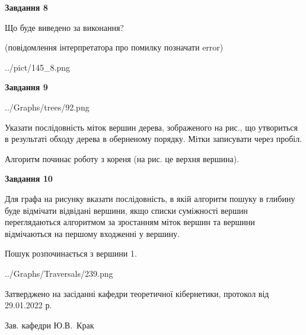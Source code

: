 \documentclass[12pt, ukrainian]{article}
\begin{document}
{\begin {large}
{\begin {center}\textbf{Завдання 8}\end {center}}\par
Що буде виведено за виконання?\par
 (повідомлення інтерпретатора про помилку позначати error)\par
\begin{center}
	{../pict/145_8.png}
\end{center}
\newpage

{\begin {center}\textbf{Завдання 9}\end {center}}\par

\begin{center}
	{../Graphs/trees/92.png}
\end{center}
Указати послідовність міток вершин дерева, зображеного на рис., що утвориться в результаті обходу дерева в оберненому порядку. Мітки записувати через пробіл.\par Алгоритм починає роботу з кореня (на рис. це верхня вершина).\par
\newpage

{\begin {center}\textbf{Завдання 10}\end {center}}\par
Для графа на рисунку вказати послідовність, в якій алгоритм пошуку в глибину буде відмічати відвідані вершини, якщо списки суміжності вершин переглядаються алгоритмом за зростанням міток вершин та вершини відмічаються на першому вход\-женні у вершину.\par
Пошук розпочинається з вершини 1.\par

\begin{center}
	{../Graphs/Traversals/239.png}
\end{center}\par
\newpage


\end {large}
}
{\smallskip \begin {small} Затверджено на засіданні кафедри теоретичної кібернетики, протокол  від   29.01.2022 р.\par\smallskip\smallskip
{\parbox {6.5 cm}{Зав. кафедри \dotfill Ю.В.~Крак}} \end{small}}
\end{document}
